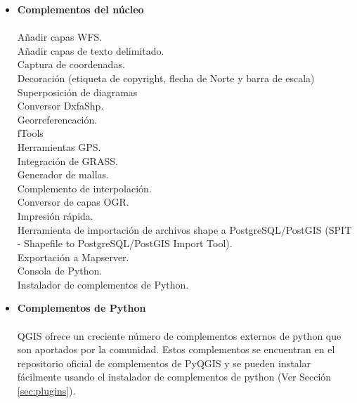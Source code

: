 \begin{itemize}
\item \textbf{Complementos del núcleo}
\\ \\ Añadir capas WFS.
\\ Añadir capas de texto delimitado.
\\ Captura de coordenadas.
\\ Decoración (etiqueta de copyright, flecha de Norte y barra de escala)
\\ Superposición de diagramas
\\ Conversor DxfaShp.
\\ Georreferencación.
\\ fTools
\\ Herramientas GPS.
\\ Integración de GRASS.
\\ Generador de mallas.
\\ Complemento de interpolación.
\\ Conversor de capas OGR.
\\ Impresión rápida.
\\ Herramienta de importación de archivos shape a PostgreSQL/PostGIS (SPIT - Shapefile to PostgreSQL/PostGIS Import Tool).
\\ Exportación a Mapserver.
\\ Consola de Python.
\\ Instalador de complementos de Python.
\\ \item \textbf{Complementos de Python}
\\ \\ QGIS ofrece un creciente número de complementos externos de python que son aportados 
por la comunidad. Estos complementos se encuentran en el repositorio oficial
de complementos de PyQGIS y se pueden instalar fácilmente usando el instalador de 
complementos de python (Ver Sección \ref{sec:plugins}).
\end{itemize}

